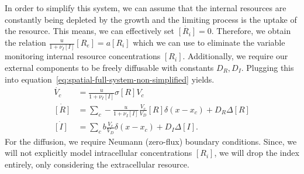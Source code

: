 \documentclass[10pt,A4paper]{article}
\numberwithin{equation}{section}
\begin{document}
In order to simplify this system, we can assume that the internal resources are constantly being depleted by the growth and the limiting process is the uptake of the resource.
This means, we can effectively set $\dot{[R_i]}=0$.
Therefore, we obtain the relation $\frac{u}{1+\nu_I [I]}[R_e] = a[R_i]$ which we can use to eliminate the variable monitoring internal resource concentrations $[R_i]$.
Additionally, we require our external components to be freely diffusable with constants $D_R,D_I$.
Plugging this into equation~\eqref{eq:spatial-full-system-non-simplified} yields.
\begin{align}
    \dot{V_c} &= \frac{u}{1+\nu_I [I]} \sigma [R]V_c\\
    \dot{[R]} &= \sum\limits_c -\frac{u}{1+\nu_I [I]} \frac{V_c}{V_D} [R] \delta(x-x_c) + D_R\Delta [R]\\
    \dot{[I]} &= \sum\limits_c b\frac{V_c}{V_D}\delta(x-x_c) + D_I\Delta [I].
    \label{eq:spatial-full-system-simplified}
\end{align}
For the diffusion, we require Neumann (zero-flux) boundary conditions.
Since, we will not explicitly model intracellular concentrations $[R_i]$, we will drop the index entirely, only considering the extracellular resource.
%
%
\end{document}
